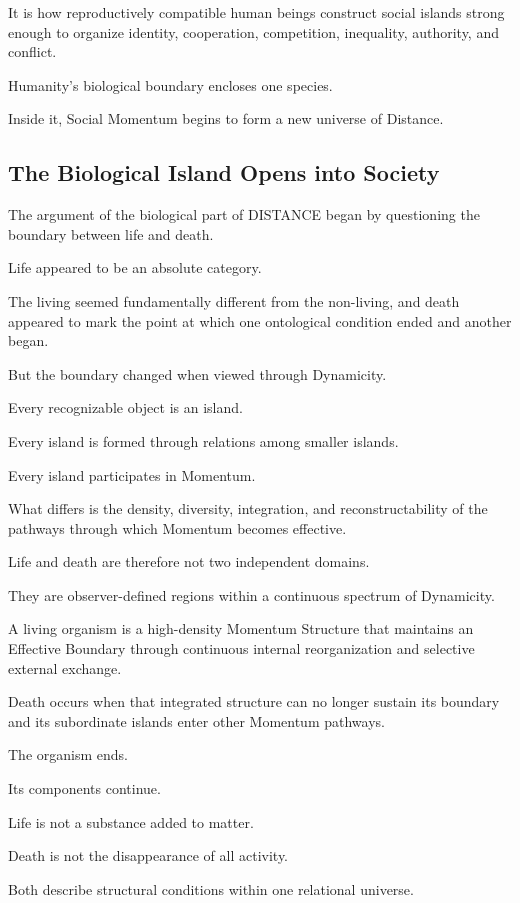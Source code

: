 It is how reproductively compatible human beings construct social islands strong enough to organize identity, cooperation, competition, inequality, authority, and conflict.

Humanity’s biological boundary encloses one species.

Inside it, Social Momentum begins to form a new universe of Distance.

\subsection*{\textbf{The Biological Island Opens into Society}} 


The argument of the biological part of DISTANCE began by questioning the boundary between life and death.

Life appeared to be an absolute category.

The living seemed fundamentally different from the non-living, and death appeared to mark the point at which one ontological condition ended and another began.

But the boundary changed when viewed through Dynamicity.

Every recognizable object is an island.

Every island is formed through relations among smaller islands.

Every island participates in Momentum.

What differs is the density, diversity, integration, and reconstructability of the pathways through which Momentum becomes effective.

Life and death are therefore not two independent domains.

They are observer-defined regions within a continuous spectrum of Dynamicity.

A living organism is a high-density Momentum Structure that maintains an Effective Boundary through continuous internal reorganization and selective external exchange.

Death occurs when that integrated structure can no longer sustain its boundary and its subordinate islands enter other Momentum pathways.

The organism ends.

Its components continue.

Life is not a substance added to matter.

Death is not the disappearance of all activity.

Both describe structural conditions within one relational universe.

